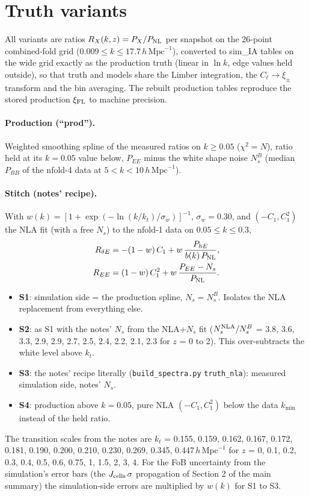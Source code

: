 \documentclass[11pt]{article}
\newcommand{\hmpc}{\,h\,\mathrm{Mpc}^{-1}}
\begin{document}
\section{Truth variants}

All variants are ratios $R_X(k, z) = P_X / P_{\rm NL}$ per snapshot on the
26-point combined-fold grid ($0.009 \le k \le 17.7\hmpc$), converted to
sim\_IA tables on the wide grid exactly as the production truth (linear in
$\ln k$, edge values held outside), so that truth and models share the Limber
integration, the $C_\ell \to \xi_\pm$ transform and the bin averaging. The
rebuilt production tables reproduce the stored production $\xi_{\rm FL}$ to
machine precision.

\paragraph{Production (``prod'').} Weighted smoothing spline of the measured
ratios on $k \ge 0.05$ ($\chi^2 = N$), ratio held at its $k = 0.05$ value
below, $P_{EE}$ minus the white shape noise $N_s^{B}$ (median $P_{BB}$ of the
nfold-4 data at $5 < k < 10\hmpc$).

\paragraph{Stitch (notes' recipe).} With $w(k) = \left[1 + \exp\!\left(-\ln(k/k_t)/\sigma_w\right)\right]^{-1}$,
$\sigma_w = 0.30$, and $(-C_1, C_1^2)$ the NLA fit (with a free $N_s$) to the
nfold-1 data on $0.05 \le k \le 0.3$,
\begin{align}
R_{\delta E} &= -(1-w)\,C_1 + w\,\frac{P_{hE}}{b(k)\,P_{\rm NL}}, \\
R_{EE} &= (1-w)\,C_1^2 + w\,\frac{P_{EE} - N_s}{P_{\rm NL}} .
\end{align}
\begin{itemize}
\item \textbf{S1}: simulation side = the production spline, $N_s = N_s^{B}$.
  Isolates the NLA replacement from everything else.
\item \textbf{S2}: as S1 with the notes' $N_s$ from the NLA+$N_s$ fit
  ($N_s^{\rm NLA}/N_s^{B}$ = 3.8, 3.6, 3.3, 2.9, 2.9, 2.7, 2.5, 2.4, 2.2, 2.1, 2.3 for
  $z$ = 0 to 2). This over-subtracts the white level above $k_t$.
\item \textbf{S3}: the notes' recipe literally (\texttt{build\_spectra.py}
  \texttt{truth\_nla}): measured simulation side, notes' $N_s$.
\item \textbf{S4}: production above $k = 0.05$, pure NLA $(-C_1, C_1^2)$ below
  the data $k_{\min}$ instead of the held ratio.
\end{itemize}
The transition scales from the notes are $k_t$ = 0.155, 0.159, 0.162, 0.167,
0.172, 0.181, 0.190, 0.200, 0.210, 0.230, 0.269, 0.345, 0.447$\hmpc$ for
$z$ = 0, 0.1, 0.2, 0.3, 0.4, 0.5, 0.6, 0.75, 1, 1.5, 2, 3, 4. For the FoB
uncertainty from the simulation's error bars (the $J_{\rm cells}\,\sigma$
propagation of Section 2 of the main summary) the simulation-side errors
are multiplied by $w(k)$ for S1 to S3.
\end{document}
